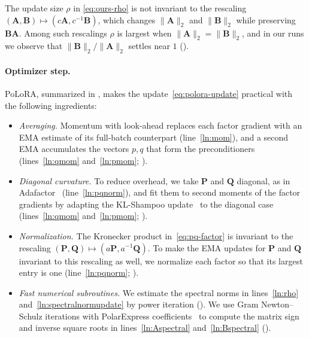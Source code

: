 \documentclass[11pt]{article}
\newcommand{\mat}[1]{\bm{#1}}
\newcommand{\norm}[1]{\| #1\|}
\newcommand{\methodname}{PoLoRA\xspace}
\begin{document}
The update size $\rho$ in \eqref{eq:ours-rho} is not invariant to the rescaling $(\mat{A},\mat{B})\mapsto(c\mat{A},c^{-1}\mat{B})$, which changes $\norm{\mat{A}}_2$ and $\norm{\mat{B}}_2$ while preserving $\mat{B}\mat{A}$. Among such rescalings $\rho$ is largest when $\norm{\mat{A}}_2=\norm{\mat{B}}_2$, and in our runs we observe that $\norm{\mat{B}}_2/\norm{\mat{A}}_2$ settles near $1$ ().
\paragraph{Optimizer step.}
\methodname{}, summarized in , makes the update~\eqref{eq:polora-update} practical with the following ingredients:
\begin{itemize}[leftmargin=1.5em,itemsep=1pt,topsep=2pt]
  \item \emph{Averaging.} Momentum with look-ahead replaces each factor gradient with an EMA estimate of its full-batch counterpart (line~\ref{ln:mom}), and a second EMA accumulates the vectors $p,q$ that form the preconditioners (lines~\ref{ln:qmom} and~\ref{ln:pmom}; ).  \item \emph{Diagonal curvature.} To reduce overhead, we take $\mat{P}$ and $\mat{Q}$ diagonal, as in Adafactor~\cite{adafactor} (line~\ref{ln:pqnorm}), and fit them to second moments of the factor gradients by adapting the KL-Shampoo update~\cite{klshampoo} to the diagonal case (lines~\ref{ln:qmom} and~\ref{ln:pmom}; ).
  \item \emph{Normalization.} The Kronecker product in~\eqref{eq:pq-factor} is invariant to the rescaling $(\mat{P},\mat{Q})\mapsto(a\mat{P},a^{-1}\mat{Q})$. To make the EMA updates for $\mat{P}$ and $\mat{Q}$ invariant to this rescaling as well, we normalize each factor so that its largest entry is one (line~\ref{ln:pqnorm}; ).
  \item \emph{Fast numerical subroutines.} We estimate the spectral norms in lines~\ref{ln:rho} and~\ref{ln:spectralnormupdate} by power iteration (). We use Gram Newton--Schulz iterations with PolarExpress coefficients~\cite{polarexpress} to compute the matrix sign and inverse square roots in lines~\ref{ln:Aspectral} and~\ref{ln:Bspectral} ().
\end{itemize}
\end{document}
